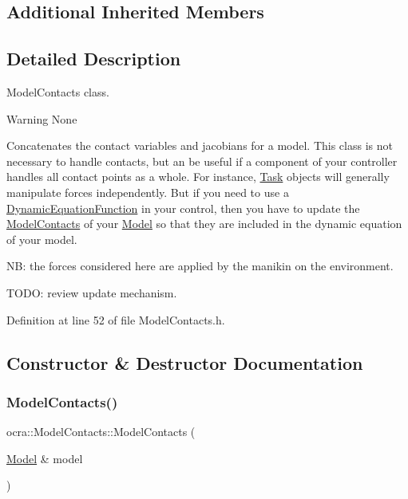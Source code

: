 \subsection*{Additional Inherited Members}


\subsection{Detailed Description}
Model\+Contacts class. 

\begin{DoxyWarning}{Warning}
None
\end{DoxyWarning}
Concatenates the contact variables and jacobians for a model. This class is not necessary to handle contacts, but an be useful if a component of your controller handles all contact points as a whole. For instance, \hyperlink{classocra_1_1Task}{Task} objects will generally manipulate forces independently. But if you need to use a \hyperlink{classocra_1_1DynamicEquationFunction}{Dynamic\+Equation\+Function} in your control, then you have to update the \hyperlink{classocra_1_1ModelContacts}{Model\+Contacts} of your \hyperlink{classocra_1_1Model}{Model} so that they are included in the dynamic equation of your model.

NB\+: the forces considered here are applied by the manikin on the environment.

T\+O\+DO\+: review update mechanism. 

Definition at line 52 of file Model\+Contacts.\+h.



\subsection{Constructor \& Destructor Documentation}
\hypertarget{classocra_1_1ModelContacts_abf9089d7762205480b46005544883e60}{}\label{classocra_1_1ModelContacts_abf9089d7762205480b46005544883e60} 
\subsubsection{\texorpdfstring{Model\+Contacts()}{ModelContacts()}}
{\footnotesize\ttfamily ocra\+::\+Model\+Contacts\+::\+Model\+Contacts (\begin{DoxyParamCaption}\item[{\hyperlink{classocra_1_1Model}{Model} \&}]{model }\end{DoxyParamCaption})}



